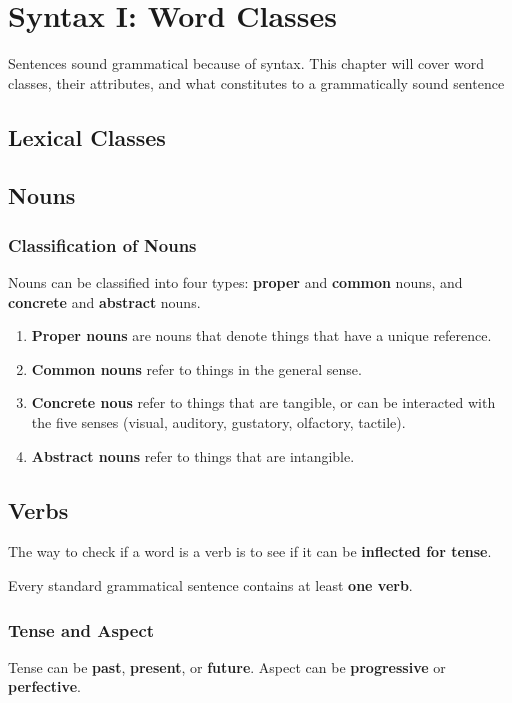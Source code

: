 \documentclass[../main.tex]{subfiles}
\begin{document}
	\chapter{Syntax I: Word Classes}
	\begin{preamb}
		Sentences sound grammatical because of syntax. This chapter will cover word classes, their attributes, and what constitutes to a grammatically sound sentence
	\end{preamb}
	\section*{Lexical Classes}
	\section{Nouns}
	
	\subsection{Classification of Nouns}
	Nouns can be classified into four types: \textbf{proper} and \textbf{common} nouns, and \textbf{concrete} and \textbf{abstract} nouns.
	
	\begin{enumerate}
		\item \textbf{Proper nouns} are nouns that denote things that have a unique reference. 
		\item \textbf{Common nouns} refer to things in the general sense.
		\item \textbf{Concrete nous} refer to things that are tangible, or can be interacted with the five senses (visual, auditory, gustatory, olfactory, tactile).
		\item \textbf{Abstract nouns} refer to things that are intangible.
	\end{enumerate}

	\section{Verbs}
	The way to check if a word is a verb is to see if it can be \textbf{inflected for tense}. 
	
	Every standard grammatical sentence contains at least \textbf{one verb}.
	
	\subsection{Tense and Aspect}
	Tense can be \textbf{past}, \textbf{present}, or \textbf{future}.
	Aspect can be \textbf{progressive} or \textbf{perfective}.
	
\end{document}
